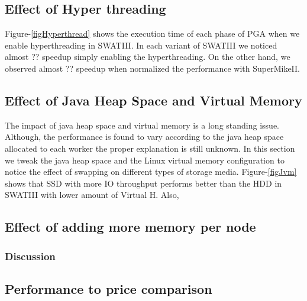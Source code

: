 \subsection {Effect of Hyper threading}
Figure-\ref{figHyperthread} shows the execution time of each phase of PGA when we enable hyperthreading in SWATIII.
In each variant of SWATIII we noticed almost ?? speedup simply enabling the hyperthreading.
On the other hand, we observed almost ?? speedup when normalized the performance with SuperMikeII.

\subsection {Effect of Java Heap Space and Virtual Memory}
The impact of java heap space and virtual memory is a long standing issue.
Although, the performance is found to vary according to the java heap space allocated to each worker the proper explanation is still unknown.
In this section we tweak the java heap space and the Linux virtual memory configuration to notice the effect of swapping on different types of storage media.
Figure-\ref{figJvm} shows that SSD with more IO throughput performs better than the HDD in SWATIII with lower amount of Virtual H.
Also, 

\subsection {Effect of adding more memory per node}

\subsubsection {Discussion}




\subsection {Performance to price comparison}